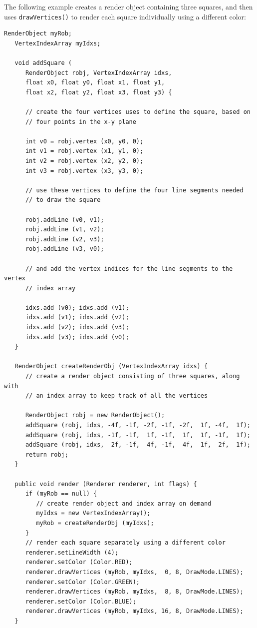 The following example creates a render object containing three
squares, and then uses {\tt drawVertices()} to render each square
individually using a different color:
%
\begin{lstlisting}[caption={Example of rendering separate features from
the same render object.},
label=threeSquares:lst]
   RenderObject myRob;
   VertexIndexArray myIdxs;

   void addSquare (
      RenderObject robj, VertexIndexArray idxs,
      float x0, float y0, float x1, float y1, 
      float x2, float y2, float x3, float y3) {

      // create the four vertices uses to define the square, based on
      // four points in the x-y plane

      int v0 = robj.vertex (x0, y0, 0);
      int v1 = robj.vertex (x1, y1, 0);
      int v2 = robj.vertex (x2, y2, 0);
      int v3 = robj.vertex (x3, y3, 0);

      // use these vertices to define the four line segments needed
      // to draw the square

      robj.addLine (v0, v1);
      robj.addLine (v1, v2);
      robj.addLine (v2, v3);
      robj.addLine (v3, v0);

      // and add the vertex indices for the line segments to the vertex
      // index array

      idxs.add (v0); idxs.add (v1); 
      idxs.add (v1); idxs.add (v2); 
      idxs.add (v2); idxs.add (v3); 
      idxs.add (v3); idxs.add (v0); 
   }

   RenderObject createRenderObj (VertexIndexArray idxs) {
      // create a render object consisting of three squares, along with
      // an index array to keep track of all the vertices
      
      RenderObject robj = new RenderObject();
      addSquare (robj, idxs, -4f, -1f, -2f, -1f, -2f,  1f, -4f,  1f);
      addSquare (robj, idxs, -1f, -1f,  1f, -1f,  1f,  1f, -1f,  1f);
      addSquare (robj, idxs,  2f, -1f,  4f, -1f,  4f,  1f,  2f,  1f);
      return robj;         
   }

   public void render (Renderer renderer, int flags) {
      if (myRob == null) {
         // create render object and index array on demand
         myIdxs = new VertexIndexArray();
         myRob = createRenderObj (myIdxs);
      }
      // render each square separately using a different color
      renderer.setLineWidth (4);
      renderer.setColor (Color.RED);
      renderer.drawVertices (myRob, myIdxs,  0, 8, DrawMode.LINES);
      renderer.setColor (Color.GREEN);
      renderer.drawVertices (myRob, myIdxs,  8, 8, DrawMode.LINES);
      renderer.setColor (Color.BLUE);
      renderer.drawVertices (myRob, myIdxs, 16, 8, DrawMode.LINES);
   }
\end{lstlisting}
